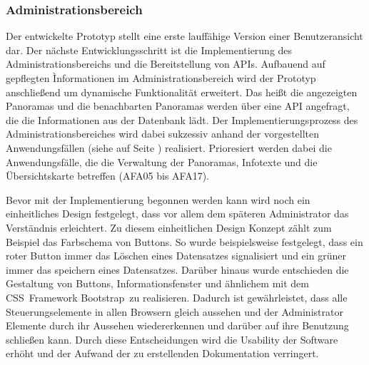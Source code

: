 \subsubsection{Administrationsbereich}
\label{sec:UmsetzungAdministrationsbereich}

Der entwickelte Prototyp stellt eine erste lauffähige Version einer Benutzeransicht dar. Der nächste Entwicklungsschritt ist die Implementierung des Administrationsbereichs und die Bereitstellung von APIs. Aufbauend auf gepflegten Ìnformationen im Administrationsbereich wird der Prototyp anschließend um dynamische Funktionalität erweitert. Das heißt die angezeigten Panoramas und die benachbarten Panoramas werden über eine API angefragt, die die Informationen aus der Datenbank lädt. Der Implementierungsprozess des Administrationsbereiches wird dabei sukzessiv anhand der vorgestellten Anwendungsfällen (siehe  auf Seite \pageref{sec:Adminstratoranwendungen}) realisiert. Prioresiert werden dabei die Anwendungsfälle, die die Verwaltung der Panoramas, Infotexte und die Übersichtskarte betreffen (AFA05 bis AFA17).

Bevor mit der Implementierung begonnen werden kann wird noch ein einheitliches Design festgelegt, dass vor allem dem späteren Administrator das Verständnis erleichtert. Zu diesem einheitlichen Design Konzept zählt zum Beispiel das Farbschema von Buttons. So wurde beispielsweise festgelegt, dass ein roter Button immer das Löschen eines Datensatzes signalisiert und ein grüner immer das speichern eines Datensatzes. Darüber hinaus wurde entschieden die Gestaltung von Buttons, Informationsfenster und ähnlichem mit dem CSS\footnotemark\ Framework Bootstrap\footnotemark\ zu realisieren. Dadurch ist gewährleistet, dass alle Steuerungselemente in allen Browsern gleich aussehen und der Administrator Elemente durch ihr Aussehen wiedererkennen und darüber auf ihre Benutzung schließen kann. Durch diese Entscheidungen wird die Usability der Software erhöht und der Aufwand der zu erstellenden Dokumentation verringert.



